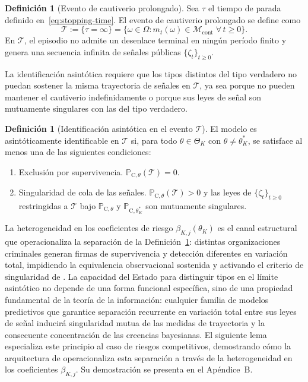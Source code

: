 \documentclass[review,authoryear,12pt]{elsarticle}
\theoremstyle{plain}
\theoremstyle{definition}
\newtheorem{definition}[theorem]{Definición}
\newcommand{\ProbC}[1]{\mathbb{P}_{\mathrm{C},#1}}
\newcommand{\ThetaK}{\Theta_K}
\newcommand{\1}{\mathbf{1}}
\begin{document}
\begin{definition}[Evento de cautiverio prolongado]\label{def:event-T-long}
Sea $\tau$ el tiempo de parada definido en~\eqref{eq:stopping-time}. El evento de cautiverio prolongado se define como
\[
\mathcal{T}:=\{\tau=\infty\}=\bigl\{\omega\in\Omega:m_t(\omega)\in\mathcal{M}_{\mathrm{cont}}\;\forall\,t\ge 0\bigr\}.
\]
En $\mathcal{T}$, el episodio no admite un desenlace terminal en ningún período finito y genera una secuencia infinita de señales públicas $\{\zeta_t\}_{t\ge 0}$.
\end{definition}

La identificación asintótica requiere que los tipos distintos del tipo verdadero no puedan sostener la misma trayectoria de señales en $\mathcal{T}$, ya sea porque no pueden mantener el cautiverio indefinidamente o porque sus leyes de señal son mutuamente singulares con las del tipo verdadero.

\begin{definition}[Identificación asintótica en el evento $\mathcal{T}$]\label{def:asymptotic-id}
El modelo es asintóticamente identificable en $\mathcal{T}$ si, para todo $\theta\in\ThetaK$ con $\theta\neq\theta_K^\ast$, se satisface al menos una de las siguientes condiciones:
\begin{enumerate}
  \item[\textup{(a)}] Exclusión por supervivencia. $\ProbC{\theta}(\mathcal{T})=0$.
  \item[\textup{(b)}] Singularidad de cola de las señales. $\ProbC{\theta}(\mathcal{T})>0$ y las leyes de $\{\zeta_t\}_{t\ge 0}$ restringidas a $\mathcal{T}$ bajo $\ProbC{\theta}$ y $\ProbC{\theta_K^\ast}$ son mutuamente singulares.
\end{enumerate}
\end{definition}

La heterogeneidad en los coeficientes de riesgo $\beta_{K,j}(\theta_K)$ es el canal estructural que operacionaliza la separación de la Definición~\ref{def:asymptotic-id}: distintas organizaciones criminales generan firmas de supervivencia y detección diferentes en variación total, impidiendo la equivalencia observacional sostenida y activando el criterio de singularidad de \citet{Kakutani1948}. La capacidad del Estado para distinguir tipos en el límite asintótico no depende de una forma funcional específica, sino de una propiedad fundamental de la teoría de la información: cualquier familia de modelos predictivos que garantice separación recurrente en variación total entre sus leyes de señal inducirá singularidad mutua de las medidas de trayectoria y la consecuente concentración de las creencias bayesianas. El siguiente lema especializa este principio al caso de riesgos competitivos, demostrando cómo la arquitectura de \citet{Cox1972} operacionaliza esta separación a través de la heterogeneidad en los coeficientes $\beta_{K,j}$. Su demostración se presenta en el Apéndice~B.
\end{document}
